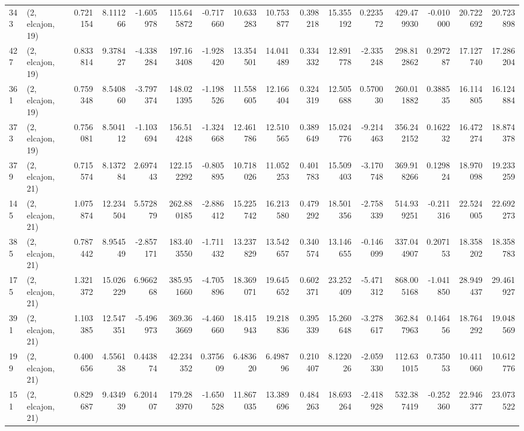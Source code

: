 \begin{tabular}{llrrrrrrrrrrrrrr}
343 &  (2, elcajon, 19) &   0.721154 &   8.111266 &  -1.605978 &   115.645872 &  -0.717660 &  10.633283 &  10.753877 &  0.398218 &  15.355192 &   0.223572 &   429.479930 &  -0.010000 &  20.722692 &  20.723898 \\
427 &  (2, elcajon, 19) &   0.833814 &   9.378427 &  -4.338284 &   197.163408 &  -1.928420 &  13.354501 &  14.041489 &  0.334332 &  12.891778 &  -2.335248 &   298.812862 &   0.297287 &  17.127740 &  17.286204 \\
361 &  (2, elcajon, 19) &   0.759348 &   8.540860 &  -3.797374 &   148.021395 &  -1.198526 &  11.558605 &  12.166404 &  0.324319 &  12.505688 &   0.570030 &   260.011882 &   0.388535 &  16.114805 &  16.124884 \\
373 &  (2, elcajon, 19) &   0.756081 &   8.504112 &  -1.103694 &   156.514248 &  -1.324668 &  12.461786 &  12.510565 &  0.389649 &  15.024776 &  -9.214463 &   356.242152 &   0.162232 &  16.472274 &  18.874378 \\
379 &  (2, elcajon, 21) &   0.715574 &   8.137284 &   2.697443 &   122.152292 &  -0.805895 &  10.718026 &  11.052253 &  0.401783 &  15.509403 &  -3.170748 &   369.918266 &   0.129824 &  18.970098 &  19.233259 \\
145 &  (2, elcajon, 21) &   1.075874 &  12.234504 &   5.572879 &   262.880185 &  -2.886412 &  15.225742 &  16.213580 &  0.479292 &  18.501356 &  -2.758339 &   514.939251 &  -0.211316 &  22.524005 &  22.692273 \\
385 &  (2, elcajon, 21) &   0.787442 &   8.954549 &  -2.857171 &   183.403550 &  -1.711432 &  13.237829 &  13.542657 &  0.340574 &  13.146655 &  -0.146099 &   337.044907 &   0.207153 &  18.358202 &  18.358783 \\
175 &  (2, elcajon, 21) &   1.321372 &  15.026229 &   6.966268 &   385.951660 &  -4.705896 &  18.369071 &  19.645652 &  0.602371 &  23.252409 &  -5.471312 &   868.005168 &  -1.041850 &  28.949437 &  29.461927 \\
391 &  (2, elcajon, 21) &   1.103385 &  12.547351 &  -5.496973 &   369.363669 &  -4.460660 &  18.415943 &  19.218836 &  0.395339 &  15.260648 &  -3.278617 &   362.847963 &   0.146456 &  18.764292 &  19.048569 \\
199 &  (2, elcajon, 21) &   0.400656 &   4.556138 &   0.443874 &    42.234352 &   0.375609 &   6.483620 &   6.498796 &  0.210407 &   8.122026 &  -2.059330 &   112.631015 &   0.735053 &  10.411060 &  10.612776 \\
151 &  (2, elcajon, 21) &   0.829687 &   9.434939 &   6.201407 &   179.283970 &  -1.650528 &  11.867035 &  13.389696 &  0.484263 &  18.693264 &  -2.418928 &   532.387419 &  -0.252360 &  22.946377 &  23.073522 \\

\end{tabular}

